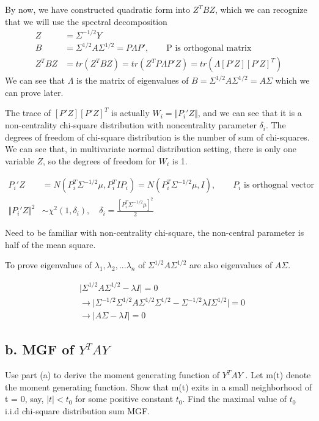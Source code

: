 By now, we have constructed quadratic form into $Z^T B Z$, which we can recognize that we will use the spectral decomposition
	\begin{align*}
	Z &= \Sigma^{-1/2} Y \\
	B &= \Sigma^{1/2} A \Sigma^{1/2} = P \Lambda P', \qquad \text{P is orthogonal matrix}\\
	Z^T B Z &= tr(Z^T B Z) = tr(Z^T P \Lambda P' Z) = tr(\Lambda [P'Z][P'Z]^T )
\end{align*} 
	We can see that $\Lambda$ is the matrix of eigenvalues of $B= \Sigma^{1/2} A \Sigma^{1/2} = A\Sigma$ which we can prove later. 
	
	The trace of $[P'Z][P'Z]^T $ is actually $W_i = \Vert P_i'Z \Vert$, and we can see that it is a non-centrality chi-square distribution with noncentrality parameter $\delta_i$. The degrees of freedom of chi-square distribution is the number of sum of chi-squares. We can see that, in multivariate normal distribution setting, there is only one variable $Z$, so the degrees of freedom for $W_i$ is 1. 

\begin{align*}
	P_i' Z &= N( P_i^T \Sigma^{-1/2} \mu, P_i^T I P_i) = N( P_i^T \Sigma^{-1/2} \mu, I ), \qquad  P_i \text{ is orthognal vector}\\
	\Vert P_i' Z \Vert^2  & \sim \chi^2 (1, \delta_i), \quad  \delta_i = \frac{[P_i^T \Sigma^{-1/2} \mu]^2}{2} 
\end{align*} 

Need to be familiar with non-centrality chi-square, the non-central parameter is half of the mean square.

To prove eigenvalues of $\lambda_1, \lambda_2, ... \lambda_n$ of $\Sigma^{1/2} A \Sigma^{1/2}$ are also eigenvalues of $A\Sigma$.

\begin{align*}
	& \Big |  \Sigma^{1/2} A \Sigma^{1/2} - \lambda I \Big | = 0\\
	& \rightarrow \Big | \Sigma^{-1/2} \Sigma^{1/2} A \Sigma^{1/2} \Sigma^{1/2} - \Sigma^{-1/2} \lambda I \Sigma^{1/2} \Big | =0 \\
	& \rightarrow \Big |  A \Sigma - \lambda I \Big | = 0
\end{align*} 
 	
	
	\subsection{b. MGF of $Y^TAY$}
	Use part (a) to derive the moment generating function of $Y^TAY$ . Let
	m(t) denote the moment generating function. Show that m(t) exits in a small neighborhood
	of t = 0, say, $|t| < t_0$ for some positive constant $t_0$. Find the maximal value
	of $ t_0$	i.i.d chi-square distribution sum MGF.
	
